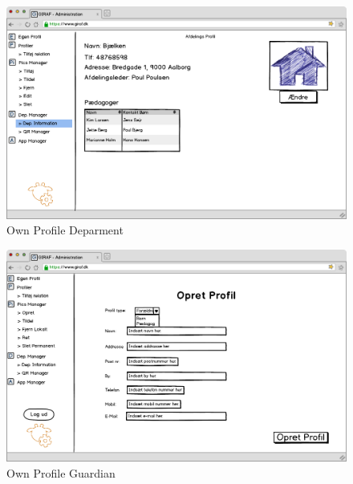\newpage

\begin{figure}[p]
\centering
\includegraphics[width=1\textwidth]{images/mockup/egenProfilDepartment.png}
\caption{Own Profile Deparment}
\label{fig:own_profile_department}
\end{figure}

\begin{figure}[p]
\centering
\includegraphics[width=1\textwidth]{images/mockup/egenProfilGaudiens.png}
\caption{Own Profile Guardian}
\label{fig:own_profile_guardian}
\end{figure}

\newpage

